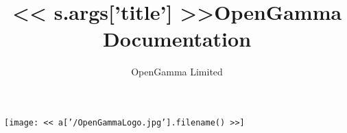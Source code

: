 \documentclass[a4paper]{amsbook}
\title{<< s.args['title'] >>}
\title{OpenGamma Documentation}
\author{OpenGamma Limited}
\begin{document}
\maketitle%

\begin{center}
\texttt{[image: << a['/OpenGammaLogo.jpg'].filename() >>]}
\hspace{1cm}
\end{center}

\end{document}
